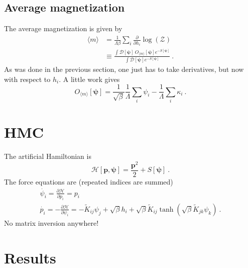 \documentclass[11pt]{article}
\begin{document}
\subsection{Average magnetization}
The average magnetization is given by
\begin{align}
\langle m\rangle&=\frac{1}{\Lambda \beta}\sum_i \frac{\partial}{\partial h_i} \log (\mathcal{Z})\\
&\equiv\frac{\int\mathcal{D}[\bm\psi]\ O_{\langle m\rangle}[\bm\psi]e^{-S[\bm\psi]}}{\int\mathcal{D}[\bm\psi]e^{-S[\bm\psi]}}\ .
\end{align}
As was done in the previous section, one just has to take derivatives, but now with respect to $h_i$.  A little work gives
\begin{equation}\label{eqn:m op}
O_{\langle m\rangle}[\bm\psi]=\frac{1}{\sqrt{\beta}}\frac{1}{\Lambda}\sum_i\psi_i -\frac{1}{\Lambda}\sum_i\kappa_i\ .
\end{equation}

\section{HMC}
The artificial Hamiltonian is
\begin{equation}
\mathcal{H}[\bm p,\bm \psi]=\frac{\bm p^2}{2}+S[\bm \psi]\ .
\end{equation}
The force equations are (repeated indices are summed)
\begin{equation}
\begin{array}{l}
{\dot{\psi_i}=\frac{\partial \mathcal{H}}{\partial p_i}=p_i} \\
{\dot{p_i}=-\frac{\partial \mathcal{H}}{\partial\psi_i}=-\tilde{K}_{ij} \psi_j+\sqrt{\beta}h_i+\sqrt{\beta} \tilde{K}_{ij} \tanh (\sqrt{\beta} \tilde{K}_{jk} \psi_k)}\ .
\end{array}
\end{equation}
No matrix inversion anywhere!

\section{Results}


%
\end{document}
